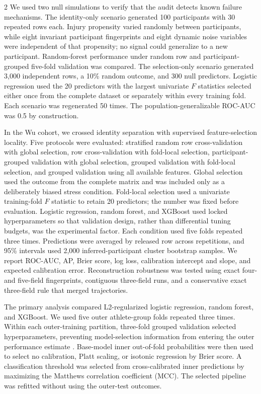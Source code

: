 \documentclass[11pt,a4paper]{article}
\begin{document}
\begin{multicols}{2}
We used two null simulations to verify that the audit detects known failure mechanisms. The identity-only scenario generated 100 participants with 30 repeated rows each. Injury propensity varied randomly between participants, while eight invariant participant fingerprints and eight dynamic noise variables were independent of that propensity; no signal could generalize to a new participant. Random-forest performance under random row and participant-grouped five-fold validation was compared. The selection-only scenario generated 3,000 independent rows, a 10\% random outcome, and 300 null predictors. Logistic regression used the 20 predictors with the largest univariate $F$ statistics selected either once from the complete dataset or separately within every training fold. Each scenario was regenerated 50 times. The population-generalizable ROC-AUC was 0.5 by construction.

In the Wu cohort, we crossed identity separation with supervised feature-selection locality. Five protocols were evaluated: stratified random row cross-validation with global selection, row cross-validation with fold-local selection, participant-grouped validation with global selection, grouped validation with fold-local selection, and grouped validation using all available features. Global selection used the outcome from the complete matrix and was included only as a deliberately biased stress condition. Fold-local selection used a univariate training-fold $F$ statistic to retain 20 predictors; the number was fixed before evaluation. Logistic regression, random forest, and XGBoost used locked hyperparameters so that validation design, rather than differential tuning budgets, was the experimental factor. Each condition used five folds repeated three times. Predictions were averaged by released row across repetitions, and 95\% intervals used 2,000 inferred-participant cluster bootstrap samples. We report ROC-AUC, AP, Brier score, log loss, calibration intercept and slope, and expected calibration error. Reconstruction robustness was tested using exact four- and five-field fingerprints, contiguous three-field runs, and a conservative exact three-field rule that merged trajectories.

The primary analysis compared L2-regularized logistic regression, random forest, and XGBoost. We used five outer athlete-group folds repeated three times. Within each outer-training partition, three-fold grouped validation selected hyperparameters, preventing model-selection information from entering the outer performance estimate \cite{cawley2010}. Base-model inner out-of-fold probabilities were then used to select no calibration, Platt scaling, or isotonic regression by Brier score. A classification threshold was selected from cross-calibrated inner predictions by maximizing the Matthews correlation coefficient (MCC). The selected pipeline was refitted without using the outer-test outcomes.


\end{multicols}
\end{document}
